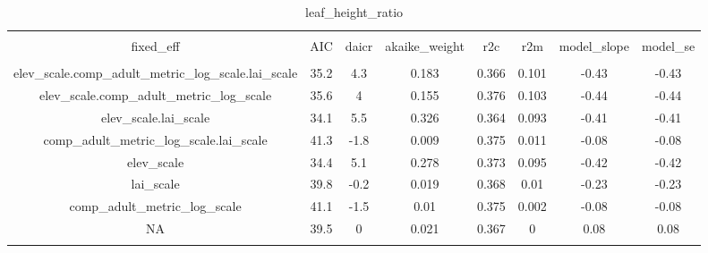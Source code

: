 
\begin{table}[!htbp] \centering 
  \caption{leaf_height_ratio} 
  \label{leaf_height_ratio} 
\begin{tabular}{@{\extracolsep{5pt}} cccccccc} 
\\[-1.8ex]\hline 
\hline \\[-1.8ex] 
fixed\_eff & AIC & daicr & akaike\_weight & r2c & r2m & model\_slope & model\_se \\ 
\hline \\[-1.8ex] 
elev\_scale.comp\_adult\_metric\_log\_scale.lai\_scale & 35.2 & 4.3 & 0.183 & 0.366 & 0.101 & -0.43 & -0.43 \\ 
elev\_scale.comp\_adult\_metric\_log\_scale & 35.6 & 4 & 0.155 & 0.376 & 0.103 & -0.44 & -0.44 \\ 
elev\_scale.lai\_scale & 34.1 & 5.5 & 0.326 & 0.364 & 0.093 & -0.41 & -0.41 \\ 
comp\_adult\_metric\_log\_scale.lai\_scale & 41.3 & -1.8 & 0.009 & 0.375 & 0.011 & -0.08 & -0.08 \\ 
elev\_scale & 34.4 & 5.1 & 0.278 & 0.373 & 0.095 & -0.42 & -0.42 \\ 
lai\_scale & 39.8 & -0.2 & 0.019 & 0.368 & 0.01 & -0.23 & -0.23 \\ 
comp\_adult\_metric\_log\_scale & 41.1 & -1.5 & 0.01 & 0.375 & 0.002 & -0.08 & -0.08 \\ 
NA & 39.5 & 0 & 0.021 & 0.367 & 0 & 0.08 & 0.08 \\ 
\hline \\[-1.8ex] 
\end{tabular} 
\end{table} 

